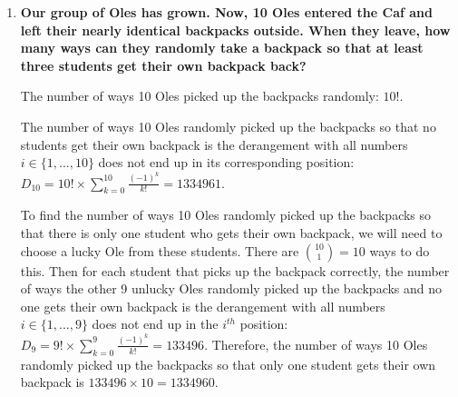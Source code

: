 \documentclass[10pt]{article}
\begin{document}
\begin{enumerate}
If we want both FROM and MATH in the arrangement, MATH should be put right next to FROM, and M is overlapped. We will consider FROMATH as a block with 19 other letters. Therefore, $|A_1 \cap A_3| = 20!$.

When we want both MATH and RUNS in the arrangement, we will consider these two words as two blocks with the other 18 letters. Therefore, $|A_1 \cap A_2| = 20!$.

When we want both MATH and JOE or both RUNS and JOE in the arrangement, we will consider these two words as two blocks with the other 19 letters. Therefore, $|A_1 \cap A_4| = |A_2 \cap A_4| = 21!$.

When we want to have MATH, RUNS, and JOE in the arrangement, we will consider these three words as three blocks with the other 15 letters. Therefore, $|A_1 \cap A_2 \cap A_4| = 18!$.

Therefore, we have $|A_1 \cup A_2 \cup A_3 \cup A_4| = (|A_1| + |A_2| + |A_3| + |A_4|) - (|A_1 \cap A_2| + \ldots + |A_3 \cap A_4|) + (|A_1 \cap A_2 \cap A_3| + \ldots + |A_2 \cap A_3 \cap A_4|) - |A_1 \cap A_2 \cap A_3 \cap A_4| = 23! + 23! + 23! + 24! - (20! + 20! + 21! + 21!) + 18! = 23! \times 3 + 24! - 20! \times 2 - 21! \times 2 + 18!$. 

Therefore, the number of ways to arrange the 26 letters of the alphabet so that none of the words MATH, RUNS, FROM, or JOE appear: $26! - |A_1 \cup A_2 \cup A_3 \cup A_4| = 26! - (23! \times 3 + 24! - 20! \times 2 - 21! \times 2 + 18!)$.

 pt

\item
\textbf{Our group of Oles has grown. Now, 10 Oles entered the Caf and left their nearly identical backpacks outside. When they leave, how many ways can they randomly take a backpack so that at least three students get their own backpack back?}

The number of ways 10 Oles picked up the backpacks randomly: $10!$.

The number of ways 10 Oles randomly picked up the backpacks so that no students get their own backpack is the derangement with all numbers $i \in \{1, ..., 10 \}$ does not end up in its corresponding position: $D_{10} = 10! \times \sum \limits_{k=0}^{10}\frac{(-1)^k}{k!} = 1334961$.

To find the number of ways 10 Oles randomly picked up the backpacks so that there is only one student who gets their own backpack, we will need to choose a lucky Ole from these students. There are $\binom{10}{1} = 10$ ways to do this. Then for each student that picks up the backpack correctly, the number of ways the other 9 unlucky Oles randomly picked up the backpacks and no one gets their own backpack is the derangement with all numbers $i \in \{1, ..., 9 \}$ does not end up in the $i^{th}$ position: $D_{9} = 9! \times \sum \limits_{k=0}^{9}\frac{(-1)^k}{k!} = 133496$. Therefore, the number of ways 10 Oles randomly picked up the backpacks so that only one student gets their own backpack is $133496 \times 10 = 1334960$.


\end{enumerate}
\end{document}
